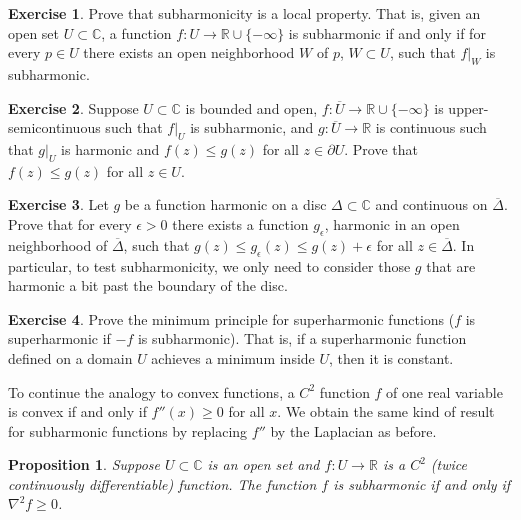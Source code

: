 \documentclass[12pt,openany]{book}
\newcommand{\widebar}[1]{\overline{#1}}
\newcommand{\C}{{\mathbb{C}}}
\newcommand{\R}{{\mathbb{R}}}
\theoremstyle{plain}
\newtheorem{prop}[thm]{Proposition}
\theoremstyle{remark}
\theoremstyle{definition}
\newenvironment{exbox}{%
    \def\FrameCommand{\vrule width 1pt \relax\hspace{10pt}}%
    \MakeFramed{\advance\hsize-\width\FrameRestore}%
}{%
    \endMakeFramed
}
\theoremstyle{exercise}
\newtheorem{exercise}{Exercise}[section]
\theoremstyle{example}
\newcommand{\propref}[1]{\hyperref[#1]{Proposition~\ref*{#1}}}
\begin{document}
\begin{exbox}
\begin{exercise}
Prove that subharmonicity is a local property.  That is, given an open set
$U \subset \C$, a function $f \colon U \to \R \cup \{ -\infty \}$ is subharmonic if
and only if for every $p \in U$ there exists an open neighborhood $W$ of $p$,
$W \subset U$, such that $f|_{W}$ is subharmonic.
\end{exercise}

\begin{exercise}
Suppose $U \subset \C$ is bounded and open, $f \colon \widebar{U} \to \R
\cup \{-\infty\}$ is upper-semicontinuous such that $f|_U$
is subharmonic, and $g \colon \widebar{U} \to \R$ is continuous
such that $g|_U$ is harmonic and
$f(z) \leq g(z)$ for all $z \in \partial U$.  Prove that
$f(z) \leq g(z)$ for all $z \in U$.
\end{exercise}

\begin{exercise}
Let $g$ be a function
harmonic on a disc $\Delta \subset \C$ and continuous on
$\overline{\Delta}$.  Prove that for every $\epsilon > 0$ there exists
a function $g_\epsilon$, harmonic in an open neighborhood of $\overline{\Delta}$,
such that $g(z) \leq g_\epsilon(z) \leq g(z)+\epsilon$ for all $z \in
\overline{\Delta}$.
In particular, to test subharmonicity, we only need to consider those
$g$ that are harmonic a bit past the boundary of the disc.
\end{exercise}

\begin{exercise}
Prove the minimum principle for superharmonic functions ($f$ is
superharmonic if $-f$ is subharmonic).  That is, if a superharmonic function
defined on a domain $U$ achieves a minimum inside $U$, then it is
constant.
\end{exercise}
\end{exbox}

To continue the analogy to convex functions, a $C^2$ function $f$ of one
real variable is convex if and only if $f''(x) \geq 0$ for all $x$.
We obtain the same kind of result for subharmonic functions 
by replacing $f''$ by the Laplacian as before.


\begin{prop} \label{prop:C2subharmonic}
Suppose $U \subset \C$ is an open set and $f \colon U \to \R$ is a $C^2$
(twice continuously differentiable) function.
The function $f$ is subharmonic if and only if
$\nabla^2 f \geq 0$.
\end{prop}
\end{document}
